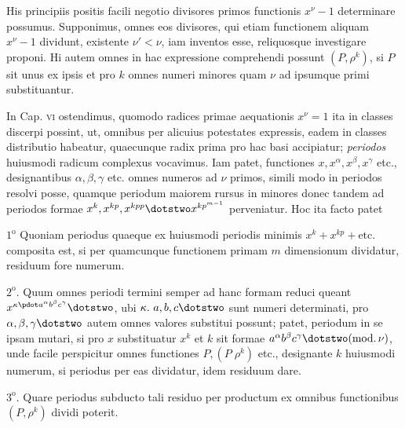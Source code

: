His principiis positis facili negotio divisores primos functionis $x^\nu-1$ determinare possumus. Supponimus, omnes eos divisores, qui etiam functionem 
aliquam $x^\nu-1$ dividunt, existente $\nu'<\nu$, iam inventos esse, reliquosque investigare proponi. Hi autem omnes in hac expressione comprehendi possunt $(P,\rho^k)$, si $P$ sit unus ex ipsis et pro $k$ omnes numeri minores quam $\nu$ ad ipsumque primi substituantur.

In Cap. \textsc{vi} ostendimus, quomodo radices primae aequationis $x^\nu=1$ ita in classes discerpi possint, ut, omnibus per alicuius potestates expressis, eadem in classes distributio habeatur, quaecunque radix prima pro hac basi accipiatur; \emph{periodos} huiusmodi radicum complexus vocavimus. Iam patet, functiones $x,x^\alpha,x^\beta,x^\gamma$ etc., designantibus $\alpha,\beta,\gamma$ etc. omnes numeros ad $\nu$ primos, simili modo in periodos resolvi posse, quamque periodum maiorem rursus in minores donec tandem ad periodos formae $x^k,x^{kp},x^{kpp}\dotstwo x^{kp^{m-1}}$ perveniatur. Hoc ita facto patet

$1^{\mathrm{o}}$ Quoniam periodus quaeque ex huiusmodi periodis minimis $x^k+x^{kp}+\text{etc.}$ composita est, si per quamcunque functionem primam $m$ dimensionum dividatur, residuum fore numerum.

$2^{\mathrm{o}}$. Quum omnes periodi termini semper ad hanc formam reduci queant $x^{\kappa\pdot a^\alpha b^\beta c^\gamma}\dotstwo$, ubi $\kappa.\ a,b,c\dotstwo$ sunt numeri determinati, pro $\alpha,\beta,\gamma\dotstwo$ autem omnes valores substitui possunt; patet, periodum in se ipsam mutari, si pro $x$ substituatur $x^k$ et $k$ sit formae $a^\alpha b^\beta c^\gamma\dotstwo(\mathrm{mod.}\,\nu)$, unde facile perspicitur omnes functiones $P,(P\;\rho^k)$ etc., designante $k$ huiusmodi numerum, si periodus per eas dividatur, idem residuum dare.

$3^{\mathrm{o}}$. Quare periodus subducto tali residuo per productum ex omnibus functionibus $(P,\rho^k)$ dividi poterit.
